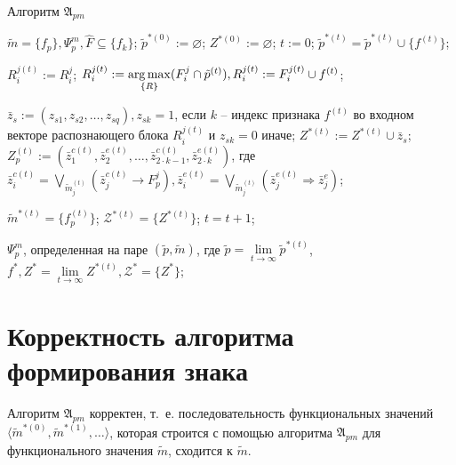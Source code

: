 \begin{algorithm}
	\caption{Алгоритм $\mathfrak{A}_{pm}$}
	\label{alg:cycle_pm}
	\begin{algorithmic}[1]
		\Require $\tilde m=\{f_p\}, \Psi_p^m, \hat F\subseteq \{f_k\}$;
		\State $\tilde p^{*(0)} := \varnothing$;
		\State $Z^{*(0)} := \varnothing$;
		\State $t := 0$;
				\State $\tilde p^{*(t)}=\tilde p^{*(t)}\cup\{f^{(t)}\}$;
				
					\State $R_i^{j(t)}:=R_i^j$;
				\Else
					\State $R_i^{j(t)}:=\operatorname*{arg\,max}\limits_{\{R\}} (F_i^j\cap\tilde p^{(t)}), R_i^{j(t)}:=F_i^{j(t)}\cup f^{(t)}$;
				\EndIf
		
				\State $\bar z_s:=(z_{s1},z_{s2},\dots,z_{sq}), z_{sk}=1$, если $k$ -- индекс признака $f^{(t)}$ во входном векторе распознающего блока $R_i^{j(t)}$ и $z_{sk}=0$ иначе;
				\State $Z^{*(t)}:=Z^{*(t)}\cup\bar z_s$;
				\State $Z_p^{(t)}:=(\bar z_1^{c(t)},\bar z_2^{e(t)},\dots,\bar z_{2\cdot k-1}^{c(t)},\bar z_{2\cdot k}^{e(t)})$, где $\bar z_i^{c(t)}=\bigvee\limits_{\tilde m_j^{(t)}}(\bar z_j^{c(t)}\rightarrow F_p^j), \bar z_i^{e(t)}=\bigvee\limits_{\tilde m_j^{(t)}}(\bar z_j^{e(t)}\Rightarrow\bar z_j^e)$;
			\EndIf
			
			\State $\tilde m^{*(t)}=\{f_p^{(t)}\}$;
			\State $\mathcal Z^{*(t)}=\{Z^{*(t)}\}$;
			\State $t=t+1$;
		\EndFor

		\Return $\Psi_p^m$, определенная на паре $(\tilde p, \tilde m)$, где $\tilde p=\lim\limits_{t\rightarrow\infty}\tilde p^{*(t)}$, $f^*, Z^*=\lim\limits_{t\rightarrow\infty}Z^{*(t)},\mathcal Z^*=\{Z^*\}$;
	\end{algorithmic}
\end{algorithm}


\section{Корректность алгоритма формирования знака} \label{sect3_4}

\begin{Theorem}
	Алгоритм $\mathfrak A_{pm}$ корректен, т.~е. последовательность функциональных значений $\langle\tilde m^{*(0)},\tilde m^{*(1)},\dots\rangle$, которая строится с помощью алгоритма $\mathfrak A_{pm}$ для функционального значения $\tilde m$, сходится к $\tilde m$.
\end{Theorem}

